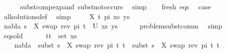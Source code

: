 \begin{isabellebody}
\ \ \ \ \isamarkupfalse%
\ subst{\isacharunderscore}{\kern0pt}comp{\isacharunderscore}{\kern0pt}expand\ subst{\isacharunderscore}{\kern0pt}not{\isacharunderscore}{\kern0pt}occurs\ \isamarkupfalse%
\ simp\isanewline
\isanewline
\ \ \isamarkupfalse%
\ fresh\ eqs\ \isamarkupfalse%
\ {\isacharquery}{\kern0pt}case\isanewline
\ \ \ \ \isamarkupfalse%
\ all{\isacharunderscore}{\kern0pt}solutions{\isacharunderscore}{\kern0pt}def\ \isamarkupfalse%
\ simp\isanewline
{}\isamarkupfalse%
\isanewline
\ \ \isamarkupfalse%
\ {\isacharparenleft}{\kern0pt}{}\ X\ t{\isacharprime}{\kern0pt}\ pi\ xs\ ys{\isacharparenright}{\kern0pt}\isanewline
\ \ \isamarkupfalse%
\ {\isachardoublequoteopen}{\isacharparenleft}{\kern0pt}nabla{}{\isacharcomma}{\kern0pt}\ s{}\ {\isasymbullet}\ {\isacharbrackleft}{\kern0pt}{\isacharparenleft}{\kern0pt}X{\isacharcomma}{\kern0pt}\ swap\ {\isacharparenleft}{\kern0pt}rev\ pi{\isacharparenright}{\kern0pt}\ t{\isacharprime}{\kern0pt}{\isacharparenright}{\kern0pt}{\isacharbrackright}{\kern0pt}{\isacharparenright}{\kern0pt}\ {\isasymin}\ U\ {\isacharparenleft}{\kern0pt}xs{\isacharcomma}{\kern0pt}\ ys{\isacharparenright}{\kern0pt}{\isachardoublequoteclose}\isanewline
\ \ \ \ \isamarkupfalse%
\ problem{\isacharunderscore}{\kern0pt}subst{\isacharunderscore}{\kern0pt}comm\ \isamarkupfalse%
\ simp\isanewline
\ \ \isamarkupfalse%
\ eqs{\isacharunderscore}{\kern0pt}old{\isacharcolon}{\kern0pt}\ \isanewline
\ \ \ \ {\isachardoublequoteopen}{\isasymforall}\ {\isacharparenleft}{\kern0pt}t{}{\isacharcomma}{\kern0pt}t{}{\isacharparenright}{\kern0pt}\ {\isasymin}\ set\ xs{\isachardot}{\kern0pt}\ \isanewline
\ \ \ \ nabla{}\ {\isasymturnstile}\ subst\ {\isacharparenleft}{\kern0pt}s{}\ {\isasymbullet}\ {\isacharbrackleft}{\kern0pt}{\isacharparenleft}{\kern0pt}X{\isacharcomma}{\kern0pt}\ swap\ {\isacharparenleft}{\kern0pt}rev\ pi{\isacharparenright}{\kern0pt}\ t{\isacharprime}{\kern0pt}{\isacharparenright}{\kern0pt}{\isacharbrackright}{\kern0pt}{\isacharparenright}{\kern0pt}\ t{}\ {\isasymapprox}\ subst\ {\isacharparenleft}{\kern0pt}s{}\ {\isasymbullet}\ {\isacharbrackleft}{\kern0pt}{\isacharparenleft}{\kern0pt}X{\isacharcomma}{\kern0pt}\ swap\ {\isacharparenleft}{\kern0pt}rev\ pi{\isacharparenright}{\kern0pt}\ t{\isacharprime}{\kern0pt}{\isacharparenright}{\kern0pt}{\isacharbrackright}{\kern0pt}{\isacharparenright}{\kern0pt}\ t{}{\isachardoublequoteclose}\isanewline

\end{isabellebody}
